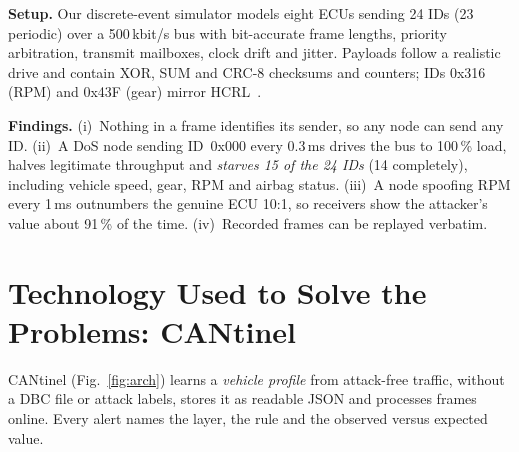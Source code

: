 \documentclass[runningheads]{llncs}
\begin{document}
\textbf{Setup.} Our discrete-event simulator models eight ECUs sending 24 IDs (23 periodic) over a 500\,kbit/s bus
with bit-accurate frame lengths, priority arbitration, transmit mailboxes, clock drift and jitter. Payloads follow a
realistic drive and contain XOR, SUM and CRC-8 checksums and counters; IDs 0x316 (RPM) and 0x43F (gear) mirror
HCRL~\cite{song2020}.

\textbf{Findings.} (i)~Nothing in a frame identifies its sender, so any node can send any ID.
(ii)~A DoS node sending ID~0x000 every 0.3\,ms drives the bus to 100\,\% load, halves legitimate throughput and
\emph{starves 15 of the 24 IDs} (14 completely), including vehicle speed, gear, RPM and airbag status.
(iii)~A node spoofing RPM every 1\,ms outnumbers the genuine ECU 10:1, so receivers show the attacker's value about
91\,\% of the time. (iv)~Recorded frames can be replayed verbatim.

\section{Technology Used to Solve the Problems: CANtinel}\label{sec:design}
CANtinel (Fig.~\ref{fig:arch}) learns a \emph{vehicle profile} from attack-free traffic, without a DBC file or attack
labels, stores it as readable JSON and processes frames online. Every alert names the layer, the rule and the observed
versus expected value.
\end{document}
